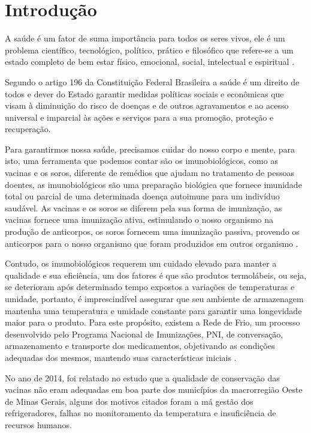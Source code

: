 \chapter[Introdução]{Introdução}
\label{cap:intro}

A saúde é um fator de suma importância para todos os seres vivos, ele é um problema científico, tecnológico, político, prático e filosófico que refere-se a um estado completo de bem estar físico, emocional, social, intelectual e espiritual \cite{almeida2011saude}. 

Segundo o artigo 196 \cite{de2013direito} da Constituição Federal Brasileira a saúde é um direito de todos e dever do Estado garantir medidas políticas sociais e econômicas que visam à diminuição do risco de doenças e de outros agravamentos e ao acesso universal e imparcial às ações e serviços para a sua promoção, proteção e recuperação.

Para garantirmos nossa saúde, precisamos cuidar do nosso corpo e mente, para isto, uma ferramenta que podemos contar são os imunobiológicos, como as vacinas e os soros, diferente de remédios que ajudam no tratamento de pessoas doentes, as imunobiológicos são uma preparação biológica que fornece imunidade total ou parcial de uma determinada doença autoimune para um indivíduo saudável. As vacinas e os soros se diferem pela sua forma de imunização, as vacinas fornece uma imunização ativa, estimulando o nosso organismo na produção de anticorpos, os soros fornecem uma imunização passiva, provendo os anticorpos para o nosso organismo que foram produzidos  em outros organismo \cite{soma2018tratamento}.

Contudo, os imunobiológicos requerem um cuidado elevado para manter a qualidade e sua eficiência, um dos fatores é que são produtos termolábeis, ou seja, se deterioram após determinado tempo expostos a variações de temperaturas e umidade, portanto, é imprescindível assegurar que seu ambiente de armazenagem mantenha uma temperatura e umidade constante \cite{ministerio2001manual} para garantir uma longevidade maior para o produto. Para este propósito, existem a Rede de Frio, um processo desenvolvido pelo Programa Nacional de Imunizações, PNI, de conversação, armazenamento e transporte dos medicamentos, objetivando as condições adequadas dos mesmos, mantendo suas características iniciais \cite{ministerio2001manual}.

No ano de 2014, foi relatado no estudo \cite{oliveira2014avaliaccao} que a qualidade de conservação das vacinas não eram adequadas em boa parte dos municípios da macrorregião Oeste de Minas Gerais, alguns dos motivos citados foram a má gestão dos refrigeradores, falhas no monitoramento da temperatura e insuficiência de recursos humanos.


